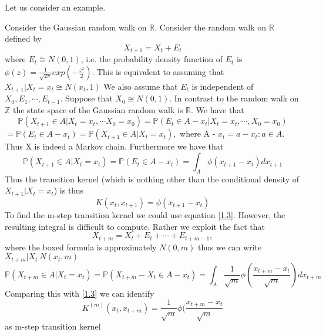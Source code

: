 \documentclass[a4paper,10pt]{article}
\newenvironment{example}[1][Example]{\begin{trivlist}
\item[\hskip \labelsep {\bfseries #1}]}{\end{trivlist}}
\newcommand{\qed}{\nobreak \ifvmode \relax \else
      \ifdim\lastskip<1.5em \hskip-\lastskip
      \hskip1.5em plus0em minus0.5em \fi \nobreak
      \vrule height0.75em width0.5em depth0.25em\fi}
\begin{document}
Let us consider an example.
\begin{example}
 Consider the Gaussian random walk on $\mathbb{R}$. Consider the random walk on $\mathbb{R}$ defined by 
 \begin{equation*}
  X_{t+1} = X_{t} + E_{t}
 \end{equation*}
where $E_{t}\cong N(0,1)$, i.e. the probability density function of $E_t$ is $\phi(z) = \frac{1}{\sqrt{2\pi}}exp(-\frac{z^{2}}{2})$.
This is equivalent to assuming that 
$X_{t+1}|X_t = x_t \cong N(x_t, 1)$
We also assume that $E_t$ is independent of $X_0,E_1,\cdots,E_{t-1}$. Suppose that $X_0 \cong N(0,1)$. In contrast
to the random walk on $\mathbb{Z}$ the state space of the Gaussian random walk is $\mathbb{R}$.
We have that 
\begin{equation*}
 \mathbb{P}(X_{t+1} \in A|X_t = x_t,\cdots X_0 = x_0) = \mathbb{P}(E_t \in A -  x_t| X_t =x_t, \cdots , X_0 = x_0)
\end{equation*}
\;\;\;\;\;\;\;\;\;\;\;\;\;\;\;$=\mathbb{P}(E_t \in A - x_t) = \mathbb{P}(X_{t+1} \in A| X_t = x_t),$
where A - $x_t = {a - x_t : a \in A}$. Thus X is indeed a Markov chain. Furthermore we have that 
\begin{equation*}
 \mathbb{P}(X_{t+1} \in A| X_t = x_t) = \mathbb{P}(E_t \in A - x_t) = \int_A \phi(x_{t+1} - x_{t})dx_{t+1} 
\end{equation*}
Thus the transition kernel (which is nothing other than the conditional density of $X_{t+1}| X_t = x_t$) is thus
\begin{equation*}
 K(x_t,x_{t+1}) = \phi(x_{t+1} -x_{t})
\end{equation*}
To find the m-step transition kernel we could use equation \ref{1.3}. However, the resulting integral is difficult
to compute. Rather we exploit the fact that 
\begin{equation*}
 X_{t+m} = X_{t} + \boxed{E_{t} + \cdots + E_{t+m-1}},
\end{equation*}
where the boxed formula is approximately $  N(0,m)$
thus we can write $X_{t+m}|X_{t} ~ N(x_{t},m)$
\begin{equation*}
 \mathbb{P}(X_{t+m} \in A|X_t = x_t) = \mathbb{P}(X_{t+m} - X_{t}\in A - x_{t}) = \int_A \frac{1}{\sqrt{m}}\phi (\frac{x_{t+m} -x_{t}}{\sqrt{m}} )dx_{t+m}
\end{equation*}
Comparing this with \ref{1.3} we can identify 
\begin{equation*}
K^{(m)}(x_t, x_{t+m}) = \frac{1}{\sqrt{m}}\phi (\frac{x_{t+m} -x_{t}}{\sqrt{m}} 
\end{equation*}
as m-step transition kernel \qed
\end{example}
\end{document}
